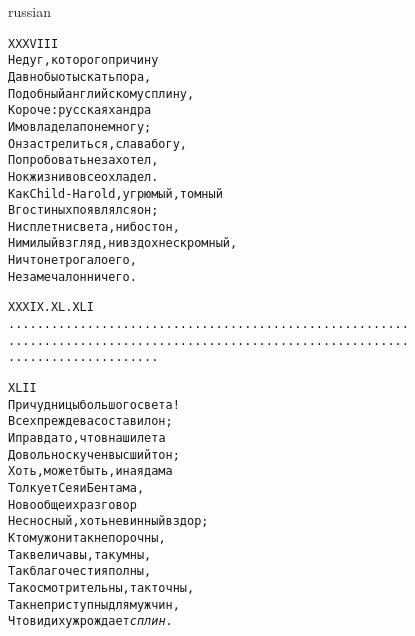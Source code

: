\documentclass[12pt,twocolumn]{article}
\begin{document}
\begin{center}
\begin{otherlanguage*}{russian}
\begin{minipage}[t]{\dimexpr 0.5\textwidth -\tabcolsep-.5pt}
\begin{alltt}\normalfont\centering
XXXVIII
Недуг, которого причину
Давно бы отыскать пора,
Подобный английскому сплину,
Короче: русская хандра
Им овладела понемногу;
Он застрелиться, слава богу,
Попробовать не захотел,
Но к жизни вовсе охладел.
Как Child-Harold, угрюмый, томный
В гостиных появлялся он;
Ни сплетни света, ни бостон,
Ни милый взгляд, ни вздох нескромный,
Ничто не трогало его,
Не замечал он ничего.
\end{alltt}
\end{minipage}
\clearpage

\begin{minipage}[t]{\dimexpr 0.5\textwidth -\tabcolsep-.5pt}
\begin{alltt}\normalfont\centering
XXXIX. XL. XLI
........................................................
........................................................
.....................
\end{alltt}
\end{minipage}

\vspace{4in}
\begin{minipage}[t]{\dimexpr 0.5\textwidth -\tabcolsep-.5pt}
\begin{alltt}\normalfont\centering
XLII
Причудницы большого света!
Всех прежде вас оставил он;
И правда то, что в наши лета
Довольно скучен высший тон;
Хоть, может быть, иная дама
Толкует Сея и Бентама,
Но вообще их разговор
Несносный, хоть невинный вздор;
К тому ж они так непорочны,
Так величавы, так умны,
Так благочестия полны,
Так осмотрительны, так точны,
Так неприступны для мужчин,
Что вид их уж рождает \textit{сплин}.
\end{alltt}
\end{minipage}

\end{otherlanguage*}
\end{center}
\end{document}

